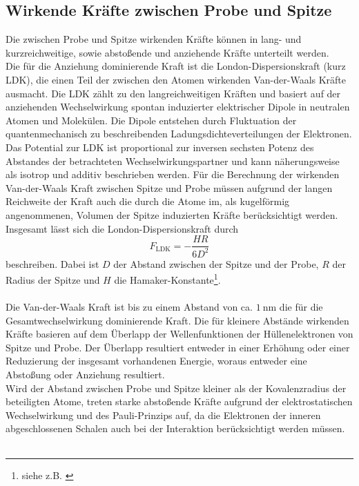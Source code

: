 \subsection{Wirkende Kräfte zwischen Probe und Spitze}
Die zwischen Probe und Spitze wirkenden Kräfte können in lang- und kurzreichweitige, sowie abstoßende und anziehende Kräfte unterteilt werden.\\
Die für die Anziehung dominierende Kraft ist die London-Dispersionskraft (kurz LDK), die einen Teil der zwischen den Atomen wirkenden Van-der-Waals Kräfte ausmacht. Die LDK zählt zu den langreichweitigen Kräften und basiert auf der anziehenden Wechselwirkung spontan induzierter elektrischer Dipole in neutralen Atomen und Molekülen. Die Dipole entstehen durch Fluktuation der quantenmechanisch zu beschreibenden Ladungsdichteverteilungen der Elektronen. Das Potential zur LDK ist proportional zur inversen sechsten Potenz des Abstandes der betrachteten Wechselwirkungspartner und kann näherungsweise als isotrop und additiv beschrieben werden.
Für die Berechnung der wirkenden Van-der-Waals Kraft zwischen Spitze und Probe müssen aufgrund der langen Reichweite der Kraft auch die durch die Atome im, als kugelförmig angenommenen, Volumen der Spitze induzierten Kräfte berücksichtigt werden.
Insgesamt lässt sich die London-Dispersionskraft durch
\begin{equation}
  F_{\text{LDK}} = -\frac{HR}{6D^2}
  \label{eqn:ldk}
\end{equation}
beschreiben. Dabei ist $D$ der Abstand zwischen der Spitze und der Probe, $R$ der Radius der Spitze und $H$ die Hamaker-Konstante\footnote{siehe z.B. \cite{Hamaker}}.\\
\\
Die Van-der-Waals Kraft ist bis zu einem Abstand von ca. $\SI{1}{\nano\meter}$ die für die Gesamtwechselwirkung dominierende Kraft. Die für kleinere Abstände wirkenden Kräfte basieren auf dem Überlapp der Wellenfunktionen der Hüllenelektronen von Spitze und Probe. Der Überlapp resultiert entweder in einer Erhöhung oder einer Reduzierung der insgesamt vorhandenen Energie, woraus entweder eine Abstoßung oder Anziehung resultiert.\\
Wird der Abstand zwischen Probe und Spitze kleiner als der Kovalenzradius der beteiligten Atome, treten starke abstoßende Kräfte aufgrund der elektrostatischen Wechselwirkung und des Pauli-Prinzips auf, da die Elektronen der inneren abgeschlossenen Schalen auch bei der Interaktion berücksichtigt werden müssen.\\
\\

